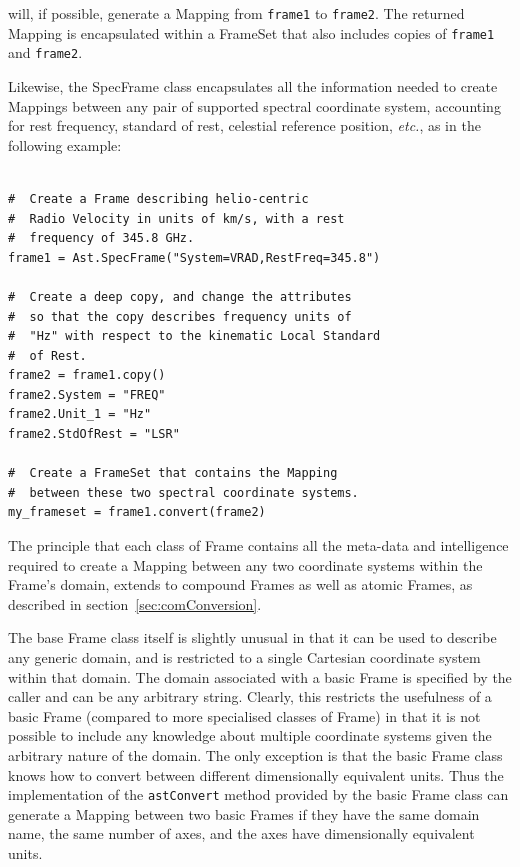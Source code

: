 \documentclass[final,authoryear,5p,times,twocolumn]{elsarticle}
\begin{document}
will, if possible, generate a Mapping from \texttt{frame1} to
\texttt{frame2}. The returned Mapping is encapsulated within a FrameSet that
also includes copies of \texttt{frame1} and \texttt{frame2}.

Likewise, the SpecFrame class encapsulates all the information needed to
create Mappings between any pair of supported spectral coordinate system,
accounting for rest frequency, standard of rest, celestial reference position,
\emph{etc.}, as in the following example:

\begin{lstlisting}

#  Create a Frame describing helio-centric
#  Radio Velocity in units of km/s, with a rest
#  frequency of 345.8 GHz.
frame1 = Ast.SpecFrame("System=VRAD,RestFreq=345.8")

#  Create a deep copy, and change the attributes
#  so that the copy describes frequency units of
#  "Hz" with respect to the kinematic Local Standard
#  of Rest.
frame2 = frame1.copy()
frame2.System = "FREQ"
frame2.Unit_1 = "Hz"
frame2.StdOfRest = "LSR"

#  Create a FrameSet that contains the Mapping
#  between these two spectral coordinate systems.
my_frameset = frame1.convert(frame2)
\end{lstlisting}

The principle that each class of Frame contains all the meta-data and
intelligence required to create a Mapping between any two coordinate
systems within the Frame's domain, extends to compound Frames as well as
atomic Frames, as described in section~\ref{sec:comConversion}.

The base Frame class itself is slightly unusual in that it can be used to
describe any generic domain, and is restricted to a single Cartesian
coordinate system within that domain. The domain associated with a basic
Frame is specified by the caller and can be any arbitrary string. Clearly,
this restricts the usefulness of a basic Frame (compared to more
specialised classes of Frame) in that it is not possible to include any
knowledge about multiple coordinate systems given the arbitrary nature of
the domain. The only exception is that the basic Frame class
knows how to convert between different dimensionally equivalent units.
Thus the implementation of the \texttt{astConvert} method provided by the
basic Frame class can generate a Mapping between two basic Frames if they
have the same domain name, the same number of axes, and the axes have
dimensionally equivalent units.
\end{document}
